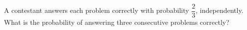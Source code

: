 A contestant answers each problem correctly with probability $\dfrac{2}{3}$, independently. What is the probability of answering three consecutive problems correctly?
